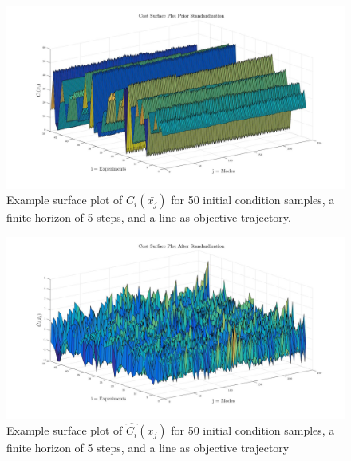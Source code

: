 \documentclass[12,twoside]{TFG-GM}
\theoremstyle{definition}
\theoremstyle{remark}
\newcommand*\diff[1]{\bar{#1}}
\begin{document}
\begin{figure}[htb!]
\begin{center}
\includegraphics[width=16cm]{surf_cost_pre_std.jpg}
\end{center}
\caption{\label{surf_pre} \small Example surface plot of $C_i(\diff{x_j})$ for 50 initial condition samples, a finite horizon of 5 steps, and a line as objective trajectory.}
\end{figure}

\begin{figure}[htb!]
\begin{center}
\includegraphics[width=16cm]{surf_cost_after_std.jpg}
\caption{\label{surf_post} \small Example surface plot of $\hat{C_i}(\diff{x_j})$ for 50 initial condition samples, a finite horizon of 5 steps, and a line as objective trajectory}
\end{center}
\end{figure}
\end{document}
